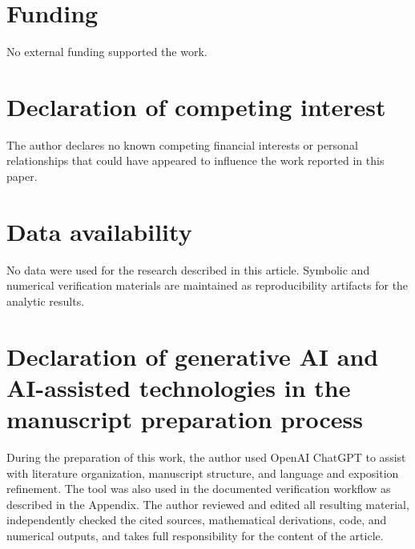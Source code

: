 \section*{Funding}
No external funding supported the work.

\section*{Declaration of competing interest}
The author declares no known competing financial interests or personal relationships that could have appeared to influence the work reported in this paper.

\section*{Data availability}
No data were used for the research described in this article. Symbolic and numerical verification materials are maintained as reproducibility artifacts for the analytic results.

\section*{Declaration of generative AI and AI-assisted technologies in the manuscript preparation process}
During the preparation of this work, the author used OpenAI ChatGPT to assist with literature organization, manuscript structure, and language and exposition refinement. The tool was also used in the documented verification workflow as described in the Appendix. The author reviewed and edited all resulting material, independently checked the cited sources, mathematical derivations, code, and numerical outputs, and takes full responsibility for the content of the article.
